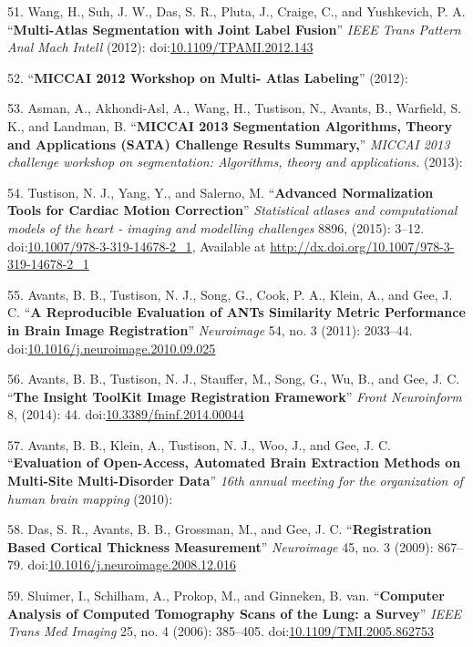 \documentclass[11pt,]{article}
\begin{document}
51. Wang, H., Suh, J. W., Das, S. R., Pluta, J., Craige, C., and
Yushkevich, P. A. ``\textbf{Multi-Atlas Segmentation with Joint Label
Fusion}'' \emph{IEEE Trans Pattern Anal Mach Intell} (2012):
doi:\href{http://dx.doi.org/10.1109/TPAMI.2012.143}{10.1109/TPAMI.2012.143}

52. ``\textbf{MICCAI 2012 Workshop on Multi- Atlas Labeling}'' (2012):

53. Asman, A., Akhondi-Asl, A., Wang, H., Tustison, N., Avants, B.,
Warfield, S. K., and Landman, B. ``\textbf{MICCAI 2013 Segmentation
Algorithms, Theory and Applications (SATA) Challenge Results Summary,}''
\emph{MICCAI 2013 challenge workshop on segmentation: Algorithms, theory
and applications.} (2013):

54. Tustison, N. J., Yang, Y., and Salerno, M. ``\textbf{Advanced
Normalization Tools for Cardiac Motion Correction}'' \emph{Statistical
atlases and computational models of the heart - imaging and modelling
challenges} 8896, (2015): 3--12.
doi:\href{http://dx.doi.org/10.1007/978-3-319-14678-2_1}{10.1007/978-3-319-14678-2\_1},
Available at \url{http://dx.doi.org/10.1007/978-3-319-14678-2_1}

55. Avants, B. B., Tustison, N. J., Song, G., Cook, P. A., Klein, A.,
and Gee, J. C. ``\textbf{A Reproducible Evaluation of ANTs Similarity
Metric Performance in Brain Image Registration}'' \emph{Neuroimage} 54,
no. 3 (2011): 2033--44.
doi:\href{http://dx.doi.org/10.1016/j.neuroimage.2010.09.025}{10.1016/j.neuroimage.2010.09.025}

56. Avants, B. B., Tustison, N. J., Stauffer, M., Song, G., Wu, B., and
Gee, J. C. ``\textbf{The Insight ToolKit Image Registration Framework}''
\emph{Front Neuroinform} 8, (2014): 44.
doi:\href{http://dx.doi.org/10.3389/fninf.2014.00044}{10.3389/fninf.2014.00044}

57. Avants, B. B., Klein, A., Tustison, N. J., Woo, J., and Gee, J. C.
``\textbf{Evaluation of Open-Access, Automated Brain Extraction Methods
on Multi-Site Multi-Disorder Data}'' \emph{16th annual meeting for the
organization of human brain mapping} (2010):

58. Das, S. R., Avants, B. B., Grossman, M., and Gee, J. C.
``\textbf{Registration Based Cortical Thickness Measurement}''
\emph{Neuroimage} 45, no. 3 (2009): 867--79.
doi:\href{http://dx.doi.org/10.1016/j.neuroimage.2008.12.016}{10.1016/j.neuroimage.2008.12.016}

59. Sluimer, I., Schilham, A., Prokop, M., and Ginneken, B. van.
``\textbf{Computer Analysis of Computed Tomography Scans of the Lung: a
Survey}'' \emph{IEEE Trans Med Imaging} 25, no. 4 (2006): 385--405.
doi:\href{http://dx.doi.org/10.1109/TMI.2005.862753}{10.1109/TMI.2005.862753}
\end{document}
